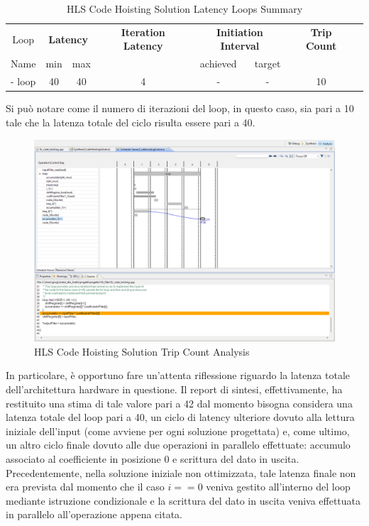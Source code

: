 \begin{table}[H]
    \centering
    \begin{tabular}{|c|c|c|c|c|c|c|c|}
        \hline
        \multicolumn{1}{|c|}{Loop} & \multicolumn{2}{|c|}{\textbf{Latency}} & \multicolumn{1}{c|}{\textbf{Iteration Latency}} & \multicolumn{2}{c|}{\textbf{Initiation Interval}} & \multicolumn{1}{c|}{\textbf{Trip Count}}  \\
        Name & min & max & & achieved & target &  \\
        \hline
        - loop & 40 & 40 & 4 & - & - & 10 \\
        \hline
    \end{tabular}
    \caption{HLS Code Hoisting Solution Latency Loops Summary }
    \label{tab:hls-code-hoisting-solution-loop-summary}
\end{table}

Si può notare come il numero di iterazioni del loop, in questo caso, sia pari a 10 tale che la latenza totale del ciclo risulta essere pari a 40.

\begin{figure}[H]
    \centering
    \includegraphics[width=1\textwidth]{solutions/code_hoisting/codehoistinganalysis.png}
    \caption{HLS Code Hoisting Solution Trip Count Analysis}
\end{figure}

In particolare, è opportuno fare un'attenta riflessione riguardo la latenza totale dell'architettura hardware in questione. Il report di sintesi, effettivamente, ha restituito una stima di tale valore pari a 42 dal momento bisogna considera una latenza totale del loop pari a 40, un ciclo di latency ulteriore dovuto alla lettura iniziale dell'input (come avviene per ogni soluzione progettata) e, come ultimo, un altro ciclo finale dovuto alle due operazioni in parallelo effettuate: accumulo associato al coefficiente in posizione 0 e scrittura del dato in uscita. Precedentemente, nella soluzione iniziale non ottimizzata, tale latenza finale non era prevista dal momento che il caso $i==0$ veniva gestito all'interno del loop mediante istruzione condizionale e la scrittura del dato in uscita veniva effettuata in parallelo all'operazione appena citata.

